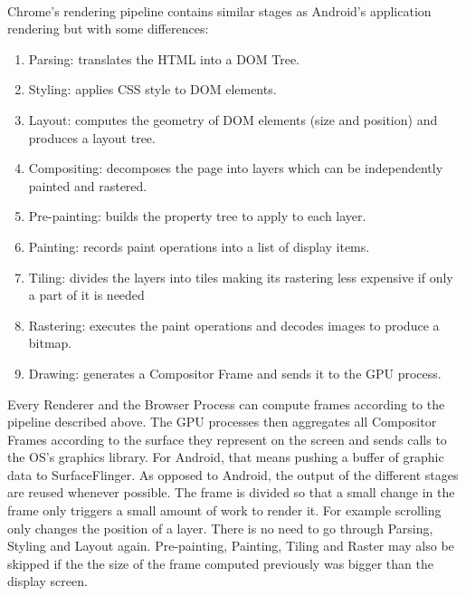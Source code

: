 \documentclass{kththesis}
\begin{document}
\paragraph{}
Chrome's rendering pipeline \cite{chrome_pixel} contains similar stages as Android's application rendering but with some differences: 
\begin{enumerate}
    \item Parsing: translates the HTML into a DOM Tree.
    \item Styling: applies CSS style to DOM elements.
    \item Layout: computes the geometry of DOM elements (size and position) and produces a layout tree.
    \item Compositing: decomposes the page into layers which can be independently painted and rastered.
    \item Pre-painting: builds the property tree to apply to each layer.
    \item Painting: records paint operations into a list of display items.
    \item Tiling: divides the layers into tiles making its rastering less expensive if only a part of it is needed
    \item Rastering: executes the paint operations and decodes images to produce a bitmap.
    \item Drawing: generates a Compositor Frame and sends it to the GPU process.
\end{enumerate}
Every Renderer and the Browser Process can compute frames according to the pipeline described above. The GPU processes then aggregates all Compositor Frames according to the surface they represent on the screen and sends calls to the OS's graphics library. For Android, that means pushing a buffer of graphic data to SurfaceFlinger.
\newline
As opposed to Android, the output of the different stages are reused whenever possible. The frame is divided so that a small change in the frame only triggers a small amount of work to render it. 
For example scrolling only changes the position of a layer. There is no need to go through Parsing, Styling and Layout again. Pre-painting, Painting, Tiling and Raster may also be skipped if the the size of the frame computed previously was bigger than the display screen.  

\end{document}
